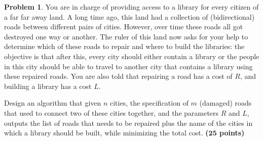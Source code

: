 \documentclass{article}
\theoremstyle{definition}
\newtheorem{problem}{Problem}
\newcommand{\grade}[1]{\hfill{\textbf{($\mathbf{#1}$ points)}}}
\begin{document}
\smallskip


\begin{problem}
	You are in charge of providing access to a library for every citizen of a far far away land. A long time ago, this land had a collection of (bidirectional) roads between different pairs of cities. However, over time these roads all got 
	destroyed one way or another. The ruler of this land now asks for your help to determine which of these roads to repair and where to build the libraries: the objective is that after this, every city should either contain a library or the 
	people in this city should be able to travel to another city that contains a library using these repaired roads. You are also told that repairing a road has a cost of $R$, and building a library has a cost $L$. 
	
	Design an algorithm that given $n$ cities, the specification of $m$ (damaged) roads that used to connect two of these cities together, and the parameters $R$ and $L$, outputs the list of roads that needs to be repaired plus 
	the name of the cities in which a library should be built, while minimizing the total cost. \grade{25}

\end{problem}

\smallskip
\end{document}
